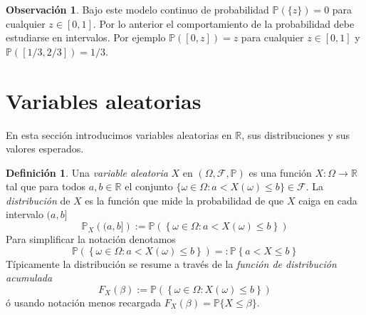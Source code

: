\documentclass[12pt]{amsart}
\theoremstyle{definition}
\newtheorem{definition}[lemma]{Definición}
\newtheorem{remark}[lemma]{Observación}
\renewcommand{\leq}{\leqslant}
\newcommand{\PP}{\ensuremath{\mathbb{P}}}
\newcommand{\RR}{\ensuremath{\mathbb{R}}}
\newcommand{\calF}{\ensuremath{\mathcal{F}}}
\begin{document}
\begin{remark} Bajo este modelo continuo de probabilidad $\PP(\{z\})=0$ para cualquier $z\in [0,1]$. Por lo anterior el comportamiento de la probabilidad debe estudiarse en intervalos. Por ejemplo $\PP([0,z])=z$ para cualquier $z\in [0,1]$ y $\PP([1/3,2/3])=1/3$. 
\end{remark}



\section{Variables aleatorias}
En esta sección introducimos variables aleatorias en $\RR$, sus distribuciones y sus valores esperados. 

\begin{definition} Una \emph{variable aleatoria} $X$ en $(\Omega,\calF,\PP)$ es una función $X:\Omega\rightarrow \RR$ tal que para todos $a,b\in \RR$ el conjunto $\{\omega\in \Omega: a<X(\omega)\leq b\}\in \calF$. La \emph{distribución} de $X$ es la función que mide la probabilidad de que $X$ caiga en cada intervalo $(a,b]$
\[\PP_X\left((a,b]\right):=\PP\left(\left\{\omega\in \Omega: a<X(\omega)\leq b\right\}\right)\]
Para simplificar la notación denotamos
\[\PP\left(\left\{\omega\in \Omega: a<X(\omega)\leq b\right\}\right)=:\PP\left\{a<X\leq b\right\}\]
Típicamente la distribución se resume a través de la \emph{función de distribución acumulada} 
\[F_X(\beta):=\PP\left(\left\{\omega\in \Omega: X(\omega)\leq b\right\}\right)\]
ó usando notación menos recargada $F_X(\beta)=
\PP\{X\leq \beta\}$.
\end{definition}
\end{document}

